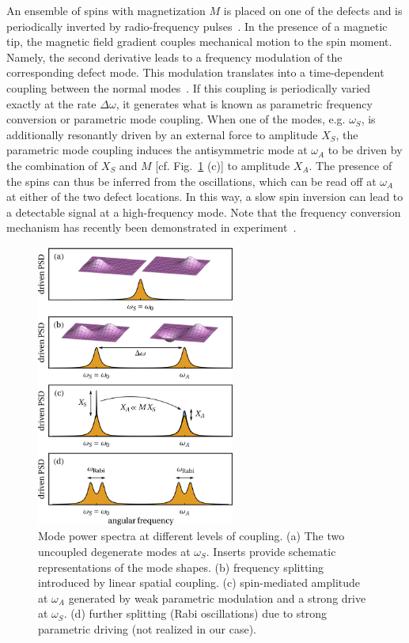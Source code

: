 An ensemble of spins with magnetization $M$ is placed on one of the defects and is periodically inverted by radio-frequency pulses~\cite{Degen_2009}. In the presence of a magnetic tip, the magnetic field gradient couples mechanical motion to the spin moment. Namely, the second derivative leads to a frequency modulation of the corresponding defect mode. This modulation translates into a time-dependent coupling between the normal modes~\cite{Frimmer_2014}. If this coupling is periodically varied exactly at the rate $\Delta \omega$, it generates what is known as parametric frequency conversion or parametric mode coupling. When one of the modes, e.g. $\omega_S$, is additionally resonantly driven by an external force to amplitude $X_S$, the parametric mode coupling induces the antisymmetric mode at $\omega_A$ to be driven by the combination of $X_S$ and $M$ [cf. Fig.~\ref{fig:splittings} (c)] to amplitude $X_A$. The presence of the spins can thus be inferred from the oscillations, which can be read off at $\omega_A$ at either of the two defect locations. In this way, a slow spin inversion can lead to a detectable signal at a high-frequency mode. Note that the frequency conversion mechanism has recently been demonstrated in experiment~\cite{Haelg_2022}. 

\begin{figure} [ht!] 
	\centering
	\includegraphics[width=65mm]{figures/spins/fig2.png}
	\caption{Mode power spectra at different levels of coupling. (a) The two uncoupled degenerate modes at $\omega_S$. Inserts provide schematic representations of the mode shapes. (b) frequency splitting introduced by linear spatial coupling. (c) spin-mediated amplitude at $\omega_A$ generated by weak parametric modulation and a strong drive at $\omega_S$. (d) further splitting (Rabi oscillations) due to strong parametric driving (not realized in our case).}
	\label{fig:splittings}
\end{figure}


